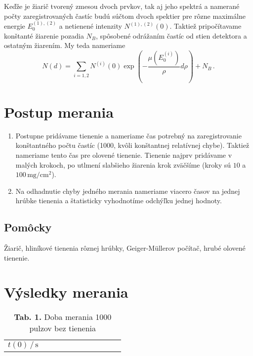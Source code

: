 \documentclass[a4paper, 10pt]{article}
\newcommand{\unit}[1]{\ensuremath{\, \mathrm{#1}}}
\begin{document}
Keďže je žiarič tvorený zmesou dvoch prvkov, tak aj jeho spektrá a namerané počty zaregistrovaných častíc budú súčtom dvoch spektier pre rôzne maximálne energie $E_0^{(1), (2)}$ a netienené intenzity $N^{(1), (2)}(0)$. Taktiež pripočítavame konštanté žiarenie pozadia $N_B$, spôsobené odrážaním častíc od stien detektora a ostatným žiarením. My teda nameriame 
\begin{equation}
\label{eq:teor:abs2}
N(d) = \sum_{i = 1, 2}N^{(i)}(0) \exp\left(-\frac{\mu(E_0^{(i)})}{\rho} d\rho\right) + N_B\,.
\end{equation}

\section*{Postup merania}
\begin{enumerate}

	\item Postupne pridávame tienenie a nameriame čas potrebný na zaregistrovanie konštantného počtu častíc (1000, kvôli konštantnej relatívnej chybe). Taktiež nameriame tento čas pre olovené tienenie. Tienenie najprv pridávame v malých krokoch, po utlmení slabšieho žiarenia krok zväčšíme (kroky sú $10$ a $100\unit{mg/cm^2}$).

    \item Na odhadnutie chyby jedného merania nameriame viacero časov na jednej hrúbke tienenia a štatisticky vyhodnotíme odchýľku jednej hodnoty.
 \end{enumerate}

\subsection*{Pomôcky} Žiarič, hliníkové tienenia rôznej hrúbky, Geiger-M\"ullerov počítač, hrubé olovené tienenie.

\section*{Výsledky merania}

\begin{table}[h!]
\centering
\begin{tabular}{c|c|c|c|c|c|c|c|c|c|c}
$ t(0)\,/\unit s $ & 

\end{tabular}
\caption*{\textbf{ Tab. 1.} Doba merania 1000 pulzov bez tienenia}
\end{table}
\end{document}
